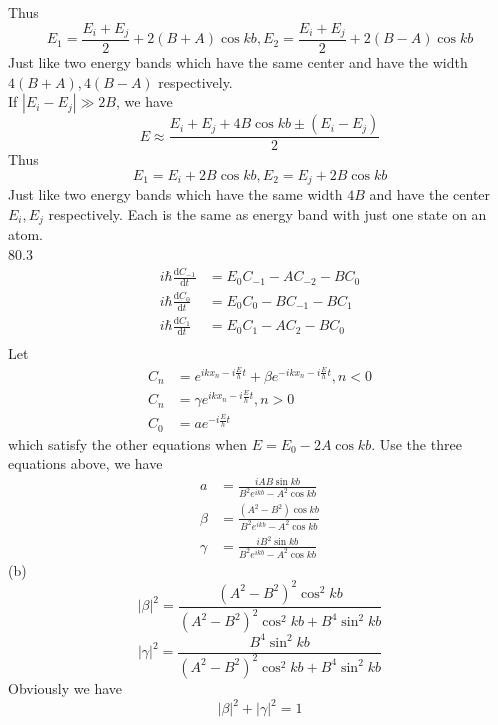 \documentclass[utf8]{ctexart}
\begin{document}
Thus
\[E_1=\frac{E_i+E_j}{2}+2(B+A)\cos kb,E_2=\frac{E_i+E_j}{2}+2(B-A)\cos kb\]
Just like two energy bands which have the same center and have the width $4(B+A),4(B-A)$ respectively.\\
If $|E_i-E_j|\gg 2B$, we have
\[E\approx\frac{E_i+E_j+4B\cos kb\pm(E_i-E_j)}{2}\]
Thus
\[E_1=E_i+2B\cos kb,E_2=E_j+2B\cos kb\]
Just like two energy bands which have the same width $4B$ and have the center $E_i,E_j$ respectively. Each is the same as energy band with just one state on an atom.\\
80.3\\
\begin{align*}
	i\hbar\frac{\mathrm{d}C_{-1}}{\mathrm{d}t}&=E_0C_{-1}-AC_{-2}-BC_0\\
	i\hbar\frac{\mathrm{d}C_{0}}{\mathrm{d}t}&=E_0C_{0}-BC_{-1}-BC_1\\
	i\hbar\frac{\mathrm{d}C_{1}}{\mathrm{d}t}&=E_0C_{1}-AC_{2}-BC_0\\
\end{align*}
Let 
\begin{align*}
	C_n&=e^{ikx_n-i\frac{E}{h}t}+\beta e^{-ikx_n-i\frac{E}{h}t},n<0\\
	C_n&=\gamma e^{ikx_n-i\frac{E}{h}t},n>0\\
	C_0&=ae^{-i\frac{E}{h}t}
\end{align*}
which satisfy the other equations when $E=E_0-2A\cos kb$. Use the three equations above, we have
\begin{align*}
	a&=\frac{iAB\sin kb}{B^2e^{ikb}-A^2\cos kb}\\
	\beta&=\frac{(A^2-B^2)\cos kb}{B^2e^{ikb}-A^2\cos kb}\\
	\gamma&=\frac{iB^2\sin kb}{B^2e^{ikb}-A^2\cos kb}
\end{align*}
(b)
\[|\beta|^2=\frac{(A^2-B^2)^2\cos^2kb}{(A^2-B^2)^2\cos^2kb+B^4\sin^2kb}\]
\[|\gamma|^2=\frac{B^4\sin^2kb}{(A^2-B^2)^2\cos^2kb+B^4\sin^2kb}\]
Obviously we have
\[|\beta|^2+|\gamma|^2=1\] 
\end{document}
